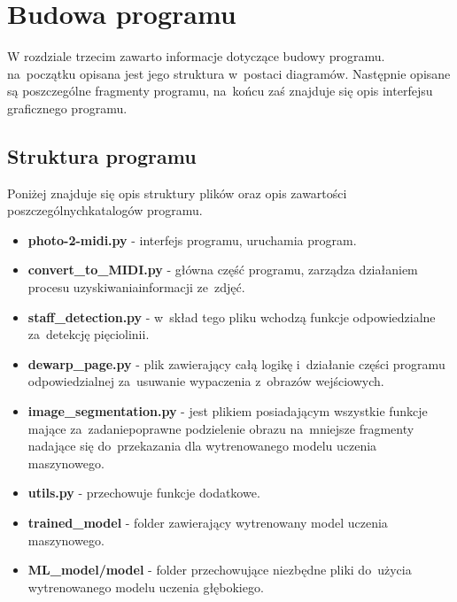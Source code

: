 \chapter{Budowa programu}
W rozdziale trzecim zawarto informacje dotyczące budowy programu. na~początku opisana jest jego struktura w~postaci diagramów. Następnie opisane są poszczególne fragmenty programu, na~końcu zaś znajduje się opis interfejsu graficznego programu.


\section{Struktura programu}

Poniżej znajduje się opis struktury plików oraz opis zawartości poszczególnych\linebreak katalogów programu.

\begin{itemize}
	\item \textbf{photo-2-midi.py} - interfejs programu, uruchamia program.
	\item \textbf{convert\_to\_MIDI.py} - główna część programu, zarządza działaniem procesu uzyskiwania\linebreak informacji ze~zdjęć.
	\item \textbf{staff\_detection.py} - w~skład tego pliku wchodzą funkcje odpowiedzialne za~detekcję pięciolinii.
	\item \textbf{dewarp\_page.py} - plik zawierający całą logikę i~działanie części programu odpowiedzialnej za~usuwanie wypaczenia z~obrazów wejściowych.
	\item \textbf{image\_segmentation.py} - jest plikiem posiadającym wszystkie funkcje mające za~zadanie\linebreak poprawne podzielenie obrazu na~mniejsze fragmenty nadające się do~przekazania dla wytrenowanego modelu uczenia maszynowego.
	\item \textbf{utils.py} - przechowuje funkcje dodatkowe.
	\item \textbf{trained\_model} - folder zawierający wytrenowany model uczenia maszynowego.
	\item \textbf{ML\_model/model} - folder przechowujące niezbędne pliki do~użycia wytrenowanego modelu uczenia głębokiego.
\end{itemize}

